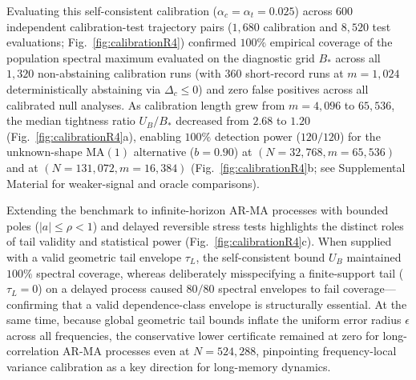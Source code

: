 \documentclass[aps,pre,reprint,amsmath,amssymb,superscriptaddress]{revtex4-2}
\begin{document}
Evaluating this self-consistent calibration ($\alpha_c = \alpha_t = 0.025$) across $600$ independent calibration-test trajectory pairs ($1,680$ calibration and $8,520$ test evaluations; Fig.~\ref{fig:calibrationR4}) confirmed $100\%$ empirical coverage of the population spectral maximum evaluated on the diagnostic grid $B_*$ across all $1,320$ non-abstaining calibration runs (with $360$ short-record runs at $m = 1,024$ deterministically abstaining via $\Delta_c \le 0$) and zero false positives across all calibrated null analyses. As calibration length grew from $m = 4,096$ to $65,536$, the median tightness ratio $U_B / B_*$ decreased from $2.68$ to $1.20$ (Fig.~\ref{fig:calibrationR4}a), enabling $100\%$ detection power ($120/120$) for the unknown-shape $\text{MA}(1)$ alternative ($b = 0.90$) at $(N = 32,768, m = 65,536)$ and at $(N = 131,072, m = 16,384)$ (Fig.~\ref{fig:calibrationR4}b; see Supplemental Material \cite{suppinfo} for weaker-signal and oracle comparisons).

Extending the benchmark to infinite-horizon $\text{AR-MA}$ processes with bounded poles ($\vert{}a\vert{} \le \rho < 1$) and delayed reversible stress tests highlights the distinct roles of tail validity and statistical power (Fig.~\ref{fig:calibrationR4}c). When supplied with a valid geometric tail envelope $\tau_L$, the self-consistent bound $U_B$ maintained $100\%$ spectral coverage, whereas deliberately misspecifying a finite-support tail ($\tau_L = 0$) on a delayed process caused $80/80$ spectral envelopes to fail coverage---confirming that a valid dependence-class envelope is structurally essential. At the same time, because global geometric tail bounds inflate the uniform error radius $\epsilon$ across all frequencies, the conservative lower certificate remained at zero for long-correlation $\text{AR-MA}$ processes even at $N = 524,288$, pinpointing frequency-local variance calibration as a key direction for long-memory dynamics.
\end{document}
